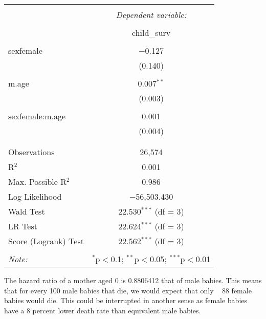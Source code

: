 \documentclass[12pt,letterpaper]{article}
\begin{document}
\begin{table}[!htbp] \centering 
	\caption{} 
	\label{} 
	\begin{tabular}{@{\extracolsep{5pt}}lc} 
		\\[-1.8ex]\hline 
		\hline \\[-1.8ex] 
		& \multicolumn{1}{c}{\textit{Dependent variable:}} \\ 
		\cline{2-2} 
		\\[-1.8ex] & child\_surv \\ 
		\hline \\[-1.8ex] 
		sexfemale & $-$0.127 \\ 
		& (0.140) \\ 
		& \\ 
		m.age & 0.007$^{**}$ \\ 
		& (0.003) \\ 
		& \\ 
		sexfemale:m.age & 0.001 \\ 
		& (0.004) \\ 
		& \\ 
		\hline \\[-1.8ex] 
		Observations & 26,574 \\ 
		R$^{2}$ & 0.001 \\ 
		Max. Possible R$^{2}$ & 0.986 \\ 
		Log Likelihood & $-$56,503.430 \\ 
		Wald Test & 22.530$^{***}$ (df = 3) \\ 
		LR Test & 22.624$^{***}$ (df = 3) \\ 
		Score (Logrank) Test & 22.562$^{***}$ (df = 3) \\ 
		\hline 
		\hline \\[-1.8ex] 
		\textit{Note:}  & \multicolumn{1}{r}{$^{*}$p$<$0.1; $^{**}$p$<$0.05; $^{***}$p$<$0.01} \\ 
	\end{tabular} 
\end{table} 



The hazard ratio of a mother aged 0 is 0.8806412 that of male babies. This means that for every 100 male babies that die, we would expect that only ~ 88 female babies would die. This could be interrupted in another sense as female babies have a 8 percent lower death rate than equivalent male babies.
\end{document}
